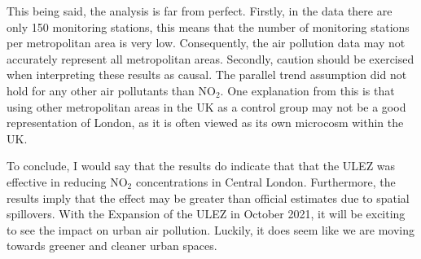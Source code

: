 \documentclass[
]{article}
\begin{document}
This being said, the analysis is far from perfect. Firstly, in the data
there are only 150 monitoring stations, this means that the number of
monitoring stations per metropolitan area is very low. Consequently, the
air pollution data may not accurately represent all metropolitan areas.
Secondly, caution should be exercised when interpreting these results as
causal. The parallel trend assumption did not hold for any other air
pollutants than NO\(_2\). One explanation from this is that using other
metropolitan areas in the UK as a control group may not be a good
representation of London, as it is often viewed as its own microcosm
within the UK.

To conclude, I would say that the results do indicate that that the ULEZ
was effective in reducing NO\(_2\) concentrations in Central London.
Furthermore, the results imply that the effect may be greater than
official estimates due to spatial spillovers. With the Expansion of the
ULEZ in October 2021, it will be exciting to see the impact on urban air
pollution. Luckily, it does seem like we are moving towards greener and
cleaner urban spaces.
\end{document}
